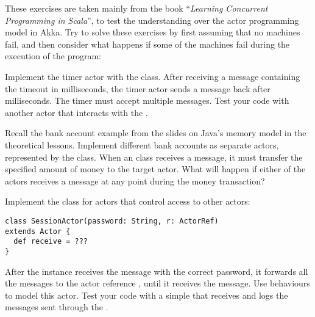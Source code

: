 \documentclass[11pt]{article}
\begin{document}
\myHeader

These exercises are taken mainly from the book ``\emph{Learning Concurrent Programming in Scala}'', to test the understanding over the actor programming model in Akka.
Try to solve these exercises by first assuming that no machines fail, and then consider what happens if some of the machines fail during the execution of the program:

\begin{myExercise}
Implement the timer actor with the  class. After receiving a  message containing the  timeout in milliseconds, the timer actor sends a  message back after  milliseconds. The timer must accept multiple  messages. Test your code with another actor  that interacts with the .
\end{myExercise}

\begin{myExercise}
Recall the bank account example from the slides on Java's memory model in the theoretical lessons. Implement different bank accounts as separate actors, represented by the  class. When an  class receives a  message, it must transfer the specified amount of money to the target actor. What will happen if either of the actors receives a  message at any point during the money transaction?
\end{myExercise}

\begin{myExercise}
Implement the  class for actors that control access to other actors:
\begin{lstlisting}
class SessionActor(password: String, r: ActorRef)
extends Actor {
  def receive = ???
}
\end{lstlisting}
After the  instance receives the  message with the correct password, it forwards all the messages to the actor reference , until it receives the  message. Use behaviours to model this actor. Test your code with a simple  that receives and logs the messages sent through the .
\end{myExercise}
\end{document}
